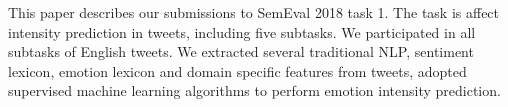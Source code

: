 This paper describes our submissions to SemEval 2018 task 1. The task is affect intensity prediction in tweets, including five subtasks. We participated in all subtasks of English tweets. We extracted several traditional NLP, sentiment lexicon, emotion lexicon and domain specific features from tweets, adopted supervised machine learning algorithms to perform emotion intensity prediction.
